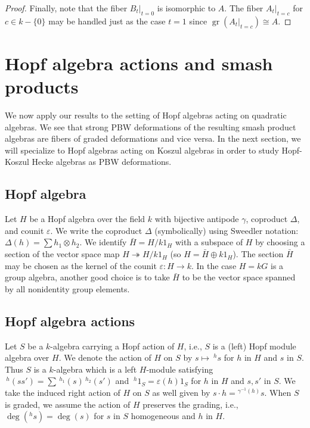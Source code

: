 \documentclass[11pt]{amsart}
\numberwithin{equation}{section}
\DeclareMathOperator{\gr}{gr}
\renewcommand{\_}[1]{\mbox{$_{\left( #1 \right)}$}}
\newcommand{\ot}{\otimes}
\newcommand{\Ho}{H}%
\begin{document}
{\begin{proof}
Finally, note that the fiber $B_t | _{t=0}$ is isomorphic to $A$.
The fiber $A_t | _{t=c}$
for $c\in k - \{0\}$ 
may be handled just as the case $t=1$
since $\gr (A_t | _{t=c})\cong A$.
\end{proof}


\section{Hopf algebra actions and smash products}
\label{sec:smashproducts}

We now apply our results to the setting of
Hopf algebras acting on quadratic algebras.
We see that strong PBW deformations of the resulting smash product algebras
are fibers of graded deformations and vice versa.
In the next section, we will specialize to Hopf algebras
acting
on Koszul algebras in order to study Hopf-Koszul Hecke algebras
as PBW deformations.

 
\subsection*{Hopf algebra}
Let $\Ho$ be a Hopf algebra over the field $k$ 
with bijective antipode $\gamma$, 
coproduct $\Delta$, 
and counit $\varepsilon$.
We write 
the coproduct $\Delta$  (symbolically)
using Sweedler notation:
$\Delta(h)=\sum h_1\ot h_2$.
We identify
$\bar H=H/k1_H$ 
with a subspace of $H$ by choosing
a section of the vector space map
$H \twoheadrightarrow H/ k 1_H$
(so $H= \bar H \oplus k1_H$).
The section $\bar H$ may be chosen as the kernel of the counit
$\varepsilon: H\rightarrow k$.
In the case $H = kG$ is a group algebra, another good choice
is to take $\bar H$ to be the vector space spanned by all
nonidentity group elements. 

\subsection*{Hopf algebra actions}
Let $S$ be a $k$-algebra carrying a Hopf action of $\Ho$, i.e.,
$S$ is a (left) Hopf module algebra over $\Ho$.
We denote the action of $\Ho$ on $S$ by $s\mapsto\ {}^{h} s$ for $h$ in $\Ho$
and $s$ in $S$.
Thus $S$ is a $k$-algebra which is a left $\Ho$-module
satisfying 
$\, ^{h}(ss')= \sum \, ^{h_1}(s)\, ^{h_2}(s')$
and 
$\ ^{h}1_S = \varepsilon(h) 1_S$
for $h$ in $\Ho$ and $s,s'$ in $S$.
We take the induced right action of $\Ho$ on $S$ as well given by
$s \cdot h = {}^{\gamma^{-1}(h)}s$.
When $S$ is graded, we assume the action of $\Ho$ preserves
the grading, i.e.,
$\deg( ^{h}s)= \deg(s)$ for $s$ in $S$ homogeneous
and $h$ in $H$.

}
\end{document}
